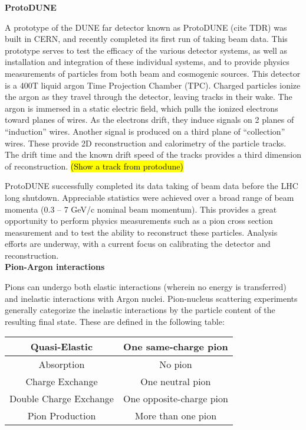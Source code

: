 \documentclass[12pt]{article}
\begin{document}
\textbf{ProtoDUNE}

	A prototype of the DUNE far detector known as ProtoDUNE (cite TDR) was built in CERN, and recently completed its first run of taking beam data. This prototype serves to test the efficacy of the various detector systems, as well as installation and integration of these individual systems, and to provide physics measurements of particles from both beam and cosmogenic sources. This detector is a 400T liquid argon Time Projection Chamber (TPC). Charged particles ionize the argon as they travel through the detector, leaving tracks in their wake. The argon is immersed in a static electric field, which pulls the ionized electrons toward planes of wires. As the electrons drift, they induce signals on 2 planes of “induction” wires. Another signal is produced on a third plane of “collection” wires. These provide 2D reconstruction and calorimetry of the particle tracks. The drift time and the known drift speed of the tracks provides a third dimension of reconstruction. \hl{(Show a track from protodune)}
	
	 ProtoDUNE successfully completed its data taking of beam data before the LHC long shutdown. Appreciable statistics were achieved over a broad range of beam momenta (0.3 – 7 GeV/c  nominal beam momentum). This provides a great opportunity to perform physics measurements such as a pion cross section measurement and to test the ability to reconstruct these particles. Analysis efforts are underway, with a current focus on calibrating the detector and reconstruction. 
\\

\textbf{Pion-Argon interactions}


	Pions can undergo both elastic interactions (wherein no energy is transferred) and inelastic interactions with Argon nuclei. Pion-nucleus scattering experiments generally categorize the inelastic interactions by the particle content of the resulting final state. These are defined in the following table:

\begin{table}[!htb]
\begin{center}
  \begin{tabular}{| c | c |}
  \hline
  Quasi-Elastic & One same-charge pion\\  
  \hline	
  Absorption & No pion \\
  \hline  
  Charge Exchange & One neutral pion \\
  \hline
  Double Charge Exchange & One opposite-charge pion \\
  \hline
  Pion Production & More than one pion \\
  \hline
  \end{tabular}
\end{center}
\end{table}
 
\end{document}

